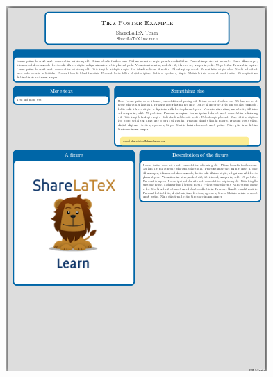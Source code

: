 \documentclass[25pt, a0paper, portrait]{tikzposter}
\begin{document}
\begin{columns}
{\begin{tikzfigure}
	    \includegraphics[width=\linewidth]{Tikzposter_theme/Autum}
	\end{tikzfigure}
    }
    {
	\begin{tikzfigure}

\end{tikzfigure}}
\end{columns}
\end{document}
